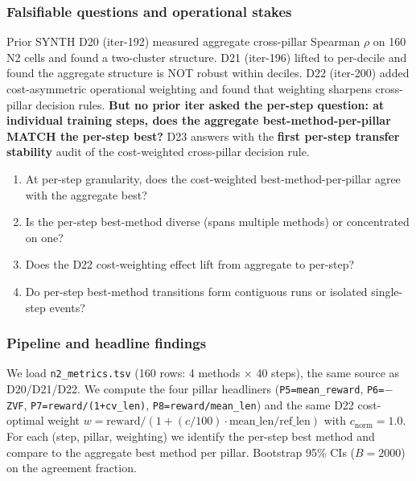 
\subsubsection{Falsifiable questions and operational stakes}\label{sec:synth-d23-questions}
Prior SYNTH D20 (iter-192) measured aggregate cross-pillar Spearman $\rho$
on 160 N2 cells and found a two-cluster structure. D21 (iter-196) lifted
to per-decile and found the aggregate structure is NOT robust within
deciles. D22 (iter-200) added cost-asymmetric operational weighting and
found that weighting sharpens cross-pillar decision rules. \textbf{But
no prior iter asked the per-step question: at individual training steps,
does the aggregate best-method-per-pillar MATCH the per-step best?} D23
answers with the \textbf{first per-step transfer stability} audit of the
cost-weighted cross-pillar decision rule.

\begin{enumerate}
\item At per-step granularity, does the cost-weighted best-method-per-pillar
  agree with the aggregate best?
\item Is the per-step best-method diverse (spans multiple methods) or
  concentrated on one?
\item Does the D22 cost-weighting effect lift from aggregate to per-step?
\item Do per-step best-method transitions form contiguous runs or isolated
  single-step events?
\end{enumerate}

\subsubsection{Pipeline and headline findings}\label{sec:synth-d23-pipeline}
We load \texttt{n2\_metrics.tsv} (160 rows: 4 methods $\times$ 40 steps),
the same source as D20/D21/D22. We compute the four pillar headliners
(\texttt{P5=mean\_reward}, \texttt{P6=$-$ZVF}, \texttt{P7=reward/(1+cv\_len)},
\texttt{P8=reward/mean\_len}) and the same D22 cost-optimal weight
$w = \mathrm{reward}/(1 + (c/100) \cdot \mathrm{mean\_len}/\mathrm{ref\_len})$
with $c_{\mathrm{norm}}=1.0$. For each (step, pillar, weighting) we identify
the per-step best method and compare to the aggregate best method per
pillar. Bootstrap 95\% CIs ($B{=}2000$) on the agreement fraction.


